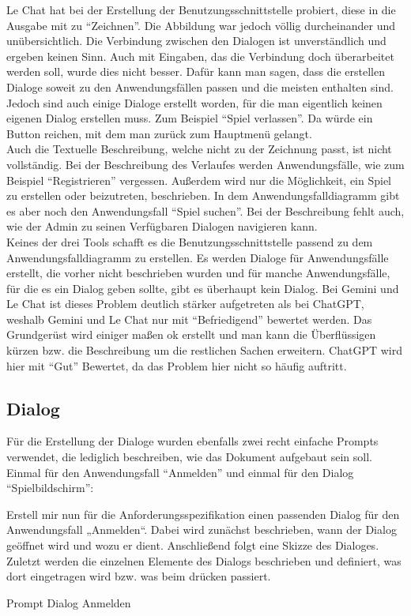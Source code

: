 Le Chat hat bei der Erstellung der Benutzungsschnittstelle probiert, diese in die Ausgabe mit zu ``Zeichnen''. Die Abbildung war jedoch 
völlig durcheinander und unübersichtlich. Die Verbindung zwischen den Dialogen ist unverständlich und ergeben keinen Sinn. Auch mit Eingaben, 
das die Verbindung doch überarbeitet werden soll, wurde dies nicht besser. Dafür kann man sagen, dass die erstellen Dialoge soweit zu den 
Anwendungsfällen passen und die meisten enthalten sind. Jedoch sind auch einige Dialoge erstellt worden, für die man eigentlich keinen eigenen
Dialog erstellen muss. Zum Beispiel ``Spiel verlassen''. Da würde ein Button reichen, mit dem man zurück zum Hauptmenü gelangt.\\
Auch die Textuelle Beschreibung, welche nicht zu der Zeichnung passt, ist nicht vollständig. Bei der Beschreibung des Verlaufes 
werden Anwendungsfälle, wie zum Beispiel ``Registrieren'' vergessen.
Außerdem wird nur die Möglichkeit, ein Spiel zu erstellen oder beizutreten, beschrieben. In dem Anwendungsfalldiagramm gibt es aber noch den Anwendungsfall 
``Spiel suchen''. Bei der Beschreibung fehlt auch, wie der Admin zu seinen Verfügbaren Dialogen navigieren kann.\\

Keines der drei Tools schafft es die Benutzungsschnittstelle passend zu dem Anwendungsfalldiagramm zu erstellen. Es werden Dialoge für 
Anwendungsfälle erstellt, die vorher nicht beschrieben wurden und für manche Anwendungsfälle, für die es ein Dialog geben sollte, 
gibt es überhaupt kein Dialog. Bei Gemini und Le Chat ist dieses Problem deutlich stärker aufgetreten als bei ChatGPT, weshalb Gemini und 
Le Chat nur mit ``Befriedigend'' bewertet werden. Das Grundgerüst wird einiger maßen ok erstellt und man kann die Überflüssigen kürzen bzw. 
die Beschreibung um die restlichen Sachen erweitern. ChatGPT wird hier mit ``Gut'' Bewertet, da das Problem hier nicht so häufig auftritt.

\subsection*{Dialog}

Für die Erstellung der Dialoge wurden ebenfalls zwei recht einfache Prompts verwendet, die lediglich beschreiben, wie das Dokument 
aufgebaut sein soll. Einmal für den Anwendungsfall ``Anmelden'' und einmal für den Dialog ``Spielbildschirm'':

\begin{prompt}[H]
    \begin{tcolorbox}[colback=gray!20, colframe=gray!20, boxrule=0pt, sharp corners] 
        Erstell mir nun für die Anforderungsspezifikation einen passenden Dialog für den Anwendungsfall „Anmelden“. Dabei wird zunächst 
        beschrieben, wann der Dialog geöffnet wird und wozu er dient. Anschließend folgt eine Skizze des Dialoges. Zuletzt werden die 
        einzelnen Elemente des Dialogs beschrieben und definiert, was dort eingetragen wird bzw. was beim drücken passiert.
        \vfill
    \end{tcolorbox}
    \caption{Prompt Dialog Anmelden}
    \label{Prompt Dialog Anmelden}
\end{prompt}

